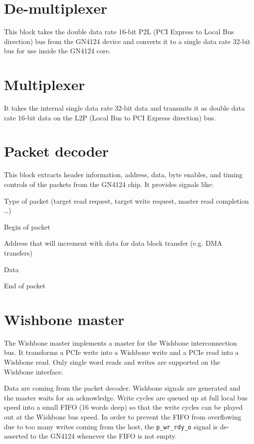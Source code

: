 \documentclass[10pt,a4paper]{cerndoc}
\begin{document}
  \section{De-multiplexer}
  This block takes the double data rate 16-bit P2L (PCI Express to Local Bus direction) bus from the GN4124 device and converts it to a single data rate 32-bit bus for use inside the GN4124 core.

  \section{Multiplexer}
  It takes the internal single data rate 32-bit data and transmits it as double data rate 16-bit data on the L2P (Local Bus to PCI Express direction) bus.

  \section{Packet decoder}
    This block extracts header information, address, data, byte enables, and timing controls of the packets from the GN4124 chip. It provides signals like:


\begin{packed_item}
  \item Type of packet (target read request, target write request, master read completion \dots)
  \item Begin of packet
  \item Address that will increment with data for data block transfer (e.g. DMA transfers)
  \item Data
  \item End of packet
\end{packed_item}

\section{Wishbone master}
The Wishbone master implements a master for the Wishbone interconnection bus.
It transforms a PCIe write into a Wishbone write and a PCIe read into a Wishbone read.
Only single word reads and writes are supported on the Wishbone interface.

Data are coming from the packet decoder.
Wishbone signals are generated and the master waits for an acknowledge.
Write cycles are queued up at full local bus speed into a small FIFO (16 words deep)
so that the write cycles can be played out at the Wishbone bus speed.
In order to prevent the FIFO from overflowing due to too many writes coming from the host,
the \verb+p_wr_rdy_o+ signal is de-asserted to the GN4124 whenever the FIFO is not empty.
\end{document}
